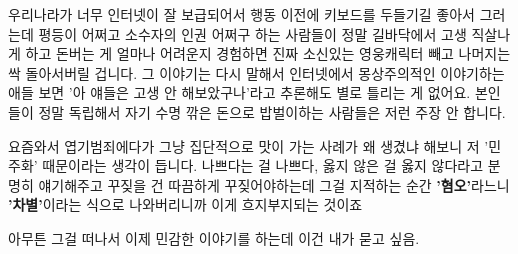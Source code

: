 우리나라가 너무 인터넷이 잘 보급되어서 행동 이전에 키보드를 두들기길 좋아서 그러는데
평등이 어쩌고 소수자의 인권 어쩌구 하는 사람들이 정말 길바닥에서 고생 직살나게 하고 돈버는 게 얼마나 어려운지 경험하면
진짜 소신있는 영웅캐릭터 빼고 나머지는 싹 돌아서버릴 겁니다.
그 이야기는 다시 말해서 인터넷에서 몽상주의적인 이야기하는 애들 보면
'아 얘들은 고생 안 해보았구나'라고 추론해도 별로 틀리는 게 없어요.
본인들이 정말 독립해서 자기 수명 깎은 돈으로 밥벌이하는 사람들은 저런 주장 안 합니다.
\vspace{5mm}

요즘와서 엽기범죄에다가 그냥 집단적으로 맛이 가는 사례가 왜 생겼냐 해보니 저 '민주화' 때문이라는 생각이 듭니다.
나쁘다는 걸 나쁘다, 옳지 않은 걸 옳지 않다라고 분명히 얘기해주고 꾸짖을 건 따끔하게 꾸짖어야하는데
그걸 지적하는 순간 \textbf{'혐오'}라느니 \textbf{'차별'}이라는 식으로 나와버리니까 이게 흐지부지되는 것이죠
\vspace{5mm}

아무튼 그걸 떠나서 이제 민감한 이야기를 하는데 이건 내가 묻고 싶음.
\vspace{5mm}

